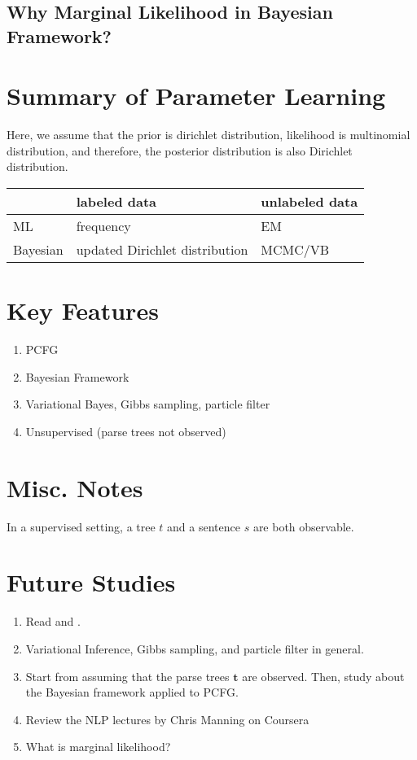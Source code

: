 \documentclass[11pt]{article}
\begin{document}
\subsection{Why Marginal Likelihood in Bayesian Framework?}

\section{Summary of Parameter Learning \cite{mlss09}}

Here, we assume that the prior is dirichlet distribution, likelihood is multinomial distribution, and therefore, the posterior distribution is also Dirichlet distribution.

\begin{center}
    \begin{tabular}{|l|l|l|}
    \hline
             & labeled data                    & unlabeled data  \\\hline
    ML       & frequency                       & EM              \\\hline
    Bayesian & updated Dirichlet distribution  & MCMC/VB         \\\hline
    \end{tabular}
\end{center}

\section{Key Features}
\begin{enumerate}
 \item PCFG
 \item Bayesian Framework
 \item Variational Bayes, Gibbs sampling, particle filter
 \item Unsupervised (parse trees not observed)
\end{enumerate}

\section{Misc. Notes}
In a supervised setting, a tree $t$ and a sentence $s$ are both observable.


\section{Future Studies}
\begin{enumerate}
 \item Read \cite{beal2003variational} and \cite{kurihara2004application}.
 \item Variational Inference, Gibbs sampling, and particle filter in general.
 \item Start from assuming that the parse trees $\boldsymbol{t}$ are observed. Then, study about the Bayesian framework applied to PCFG.
 \item Review the NLP lectures by Chris Manning on Coursera
 \item What is marginal likelihood?
\end{enumerate}






\end{document}
